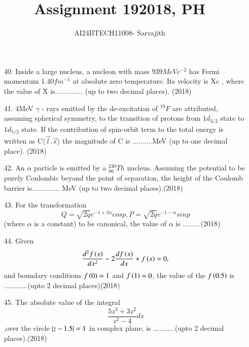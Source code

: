\documentclass[journal]{IEEEtran}
\begin{document}

\vspace{3cm}


\author{AI24BTECH11008- Sarvajith
}
\title{Assignment 19}
{\let\newpage\relax\maketitle}
\title{2018, PH}
\renewcommand{\thefigure}{\theenumi}
\renewcommand{\thetable}{\theenumi}
\setlength{\intextsep}{10pt} %
\renewcommand{\thetable}{\theenumi}
\begin{enumerate}
    \item[40.] Inside a large nucleus, a nucleon with mass $939 MeVc^{-2}$ has Fermi momentum $1.40 fm^{-1}$
    at absolute zero temperature. Its velocity is Xc , where the value of X is.............. (up
    to two decimal places). \hfill (2018)
    \item[41.] 4MeV $\gamma$ - rays emitted by the de-excitation of $^{19}F$ are attributed, assuming spherical
    symmetry, to the transition of protons from $1d_{3/2}$ state to $1d_{5/2}$ state. If the contribution
    of spin-orbit term to the total energy is written as C$\langle \overrightarrow{l}.\overrightarrow{s}\rangle$
    the magnitude of C is ..........MeV (up to one decimal place). \hfill (2018)
    \item[42.] An  $\alpha$ particle is emitted by a $^{230}_{90}Th$ nucleus. Assuming the potential to be purely
    Coulombic beyond the point of separation, the height of the Coulomb barrier is.............. MeV (up to two decimal places).\hfill (2018)
    \item[43.] For the transformation $$Q=\sqrt{2q}e^{-1+2\alpha}cosp, P = \sqrt{2q}e^{-1-\alpha}sinp$$ (where $\alpha$ is a constant) to be canonical, the value of $\alpha$ is .........\hfill (2018)
    \item[44.] Given $$\frac{d^2f\left(x\right)}{dx^2}-2\frac{df\left(x\right)}{dx}+f\left(x\right) = 0,$$ and boundary conditions $f\left(0\right) = 1$ and $f\left(1\right)=0$, the value of the $f\left(0.5\right)$ is ............(upto 2 decimal places)\hfill (2018)
    \item[45.] The absolute value of the integral $$\frac{5z^3 + 3z^2}{z^2-4}dz$$,over the circle $\left\vert z-1.5\right\vert=1$ in complex plane, is ...........(upto 2 decimal places).\hfill (2018)

\end{enumerate}
\end{document}
